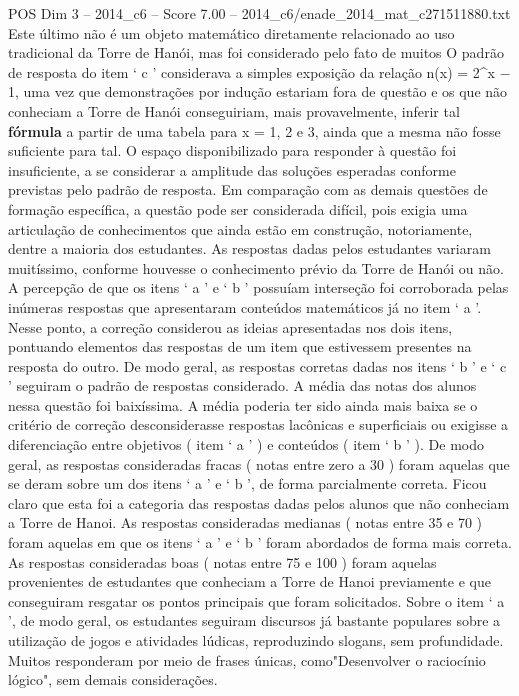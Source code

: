 \begin{textsample}{POS Dim 3 – 2014\_c6 – Score 7.00 – 2014\_c6/enade\_2014\_mat\_c271511880.txt}
Este último não é um objeto matemático diretamente relacionado ao uso tradicional da Torre de Hanói, mas foi considerado pelo fato de muitos O padrão de resposta do item ‘ c ’ considerava a simples exposição da relação n(x) = 2\textasciicircum{}x − 1, uma vez que demonstrações por indução estariam fora de questão e os que não conheciam a Torre de Hanói conseguiriam, mais provavelmente, inferir tal \textbf{fórmula} a partir de uma tabela para x = 1, 2 e 3, ainda que a mesma não fosse suficiente para tal.
O espaço disponibilizado para responder à questão foi insuficiente, a se considerar a amplitude das soluções esperadas conforme previstas pelo padrão de resposta.
Em comparação com as demais questões de formação específica, a questão pode ser considerada difícil, pois exigia uma articulação de conhecimentos que ainda estão em construção, notoriamente, dentre a maioria dos estudantes.
As respostas dadas pelos estudantes variaram muitíssimo, conforme houvesse o conhecimento prévio da Torre de Hanói ou não.
A percepção de que os itens ‘ a ’ e ‘ b ’ possuíam interseção foi corroborada pelas inúmeras respostas que apresentaram conteúdos matemáticos já no item ‘ a ’.
Nesse ponto, a correção considerou as ideias apresentadas nos dois itens, pontuando elementos das respostas de um item que estivessem presentes na resposta do outro.
De modo geral, as respostas corretas dadas nos itens ‘ b ’ e ‘ c ’ seguiram o padrão de respostas considerado.
A média das notas dos alunos nessa questão foi baixíssima.
A média poderia ter sido ainda mais baixa se o critério de correção desconsiderasse respostas lacônicas e superficiais ou exigisse a diferenciação entre objetivos ( item ‘ a ’ ) e conteúdos ( item ‘ b ’ ).
De modo geral, as respostas consideradas fracas ( notas entre zero a 30 ) foram aquelas que se deram sobre um dos itens ‘ a ’ e ‘ b ’, de forma parcialmente correta.
Ficou claro que esta foi a categoria das respostas dadas pelos alunos que não conheciam a Torre de Hanoi.
As respostas consideradas medianas ( notas entre 35 e 70 ) foram aquelas em que os itens ‘ a ’ e ‘ b ’ foram abordados de forma mais correta.
As respostas consideradas boas ( notas entre 75 e 100 ) foram aquelas provenientes de estudantes que conheciam a Torre de Hanoi previamente e que conseguiram resgatar os pontos principais que foram solicitados.
Sobre o item ‘ a ’, de modo geral, os estudantes seguiram discursos já bastante populares sobre a utilização de jogos e atividades lúdicas, reproduzindo slogans, sem profundidade.
Muitos responderam por meio de frases únicas, como"Desenvolver o raciocínio lógico", sem demais considerações.

\end{textsample}
